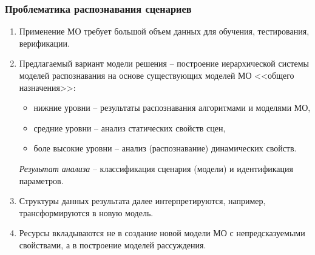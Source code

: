 \documentclass[10pt]{beamer}
\begin{document}
\begin{frame}
  \frametitle{Проблематика распознавания сценариев}
  \begin{enumerate}
  \item Применение МО требует большой объем данных для обучения, тестирования, верификации.
  \item Предлагаемый вариант модели решения -- построение иерархической системы моделей распознавания на основе существующих моделей МО <<общего назначения>>:
    \begin{itemize}
    \item нижние уровни -- результаты распознавания алгоритмами и моделями МО,
    \item средние уровни -- анализ статических свойств сцен,
    \item боле высокие уровни -- анализ (распознавание) динамических свойств.
    \end{itemize}
    \emph{Результат анализа} -- классификация сценария (модели) и идентификация параметров.


  \item Структуры данных результата далее интерпретируются, например, трансформируются в новую модель.
  \item Ресурсы вкладываются не в создание новой модели МО с непредсказуемыми свойствами, а в построение моделей рассуждения.
    \end{enumerate}
\end{frame}
\end{document}
